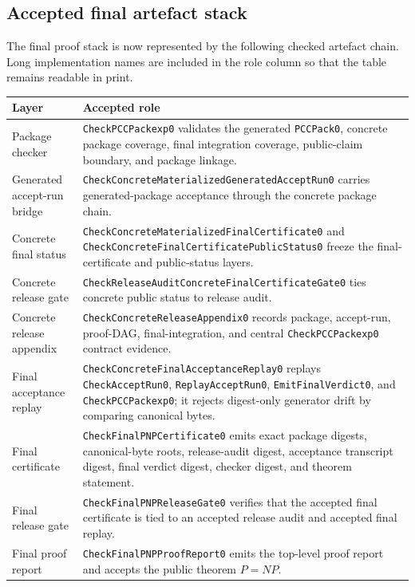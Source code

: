 \documentclass[10.5pt,a4paper]{article}
\begin{document}
\subsection{Accepted final artefact stack}
The final proof stack is now represented by the following checked artefact chain.  Long implementation names are included in the role column so that the table remains readable in print.
\begin{longtable}{>{\raggedright\arraybackslash}p{}p{}}
\toprule
Layer & Accepted role\\
\midrule
Package checker & \texttt{CheckPCCPackexp0} validates the generated \texttt{PCCPack0}, concrete package coverage, final integration coverage, public-claim boundary, and package linkage.\\
Generated accept-run bridge & \texttt{CheckConcreteMaterializedGeneratedAcceptRun0} carries generated-package acceptance through the concrete package chain.\\
Concrete final status & \texttt{CheckConcreteMaterializedFinalCertificate0} and \texttt{CheckConcreteFinalCertificatePublicStatus0} freeze the final-certificate and public-status layers.\\
Concrete release gate & \texttt{CheckReleaseAuditConcreteFinalCertificateGate0} ties concrete public status to release audit.\\
Concrete release appendix & \texttt{CheckConcreteReleaseAppendix0} records package, accept-run, proof-DAG, final-integration, and central \texttt{CheckPCCPackexp0} contract evidence.\\
Final acceptance replay & \texttt{CheckConcreteFinalAcceptanceReplay0} replays \texttt{CheckAcceptRun0}, \texttt{ReplayAcceptRun0}, \texttt{EmitFinalVerdict0}, and \texttt{CheckPCCPackexp0}; it rejects digest-only generator drift by comparing canonical bytes.\\
Final certificate & \texttt{CheckFinalPNPCertificate0} emits exact package digests, canonical-byte roots, release-audit digest, acceptance transcript digest, final verdict digest, checker digest, and theorem statement.\\
Final release gate & \texttt{CheckFinalPNPReleaseGate0} verifies that the accepted final certificate is tied to an accepted release audit and accepted final replay.\\
Final proof report & \texttt{CheckFinalPNPProofReport0} emits the top-level proof report and accepts the public theorem \(P=NP\).\\
\bottomrule
\end{longtable}
\end{document}
